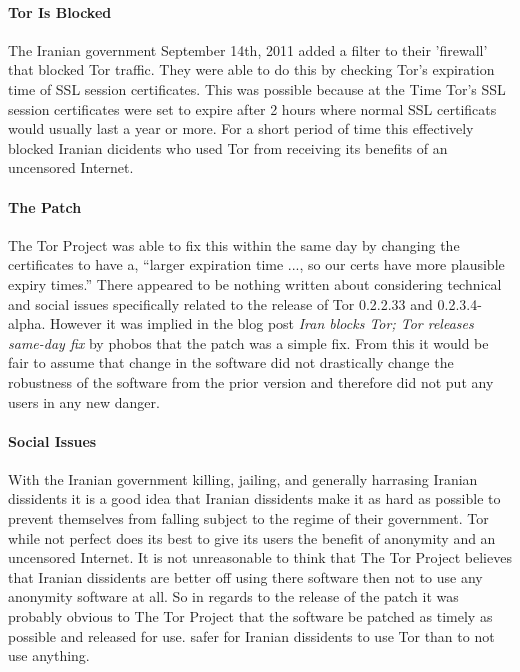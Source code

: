 \documentclass[11pt]{article}
\begin{document}
\begin{multicols}{2}
\paragraph{Tor Is Blocked}

The Iranian government September 14th, 2011 added a filter to their 'firewall'
that blocked Tor traffic. They were able to do this by checking Tor's expiration
time of SSL session certificates. This was possible because at the Time Tor's
SSL session certificates were set to expire after 2 hours where normal SSL
certificats would usually last a year or more. For a short period of time this
effectively blocked Iranian dicidents who used Tor from receiving its benefits
of an uncensored Internet. \cite{IranBlocksTorSameDayFix}

\paragraph{The Patch} 

The Tor Project was able to fix this within the same day by changing the
certificates to have a, ``larger expiration time ..., so our certs have more
plausible expiry times.'' \cite{IranBlocksTorSameDayFix} There appeared to be
nothing written about considering technical and social issues specifically
related to the release of Tor 0.2.2.33 and 0.2.3.4-alpha.  However it was
implied in the blog post \textit{Iran blocks Tor; Tor releases same-day fix} by
phobos that the patch was a simple fix. \cite{IranBlocksTorSameDayFix} From this
it would be fair to assume that change in the software did not drastically
change the robustness of the software from the prior version and therefore did
not put any users in any new danger.

\paragraph{Social Issues}

With the Iranian government killing, jailing, and generally harrasing Iranian
dissidents it is a good idea that Iranian dissidents make it as hard as possible
to prevent themselves from falling subject to the regime of their government.
Tor while not perfect does its best to give its users the benefit of anonymity
and an uncensored Internet. It is not unreasonable to think that The Tor Project
believes that Iranian dissidents are better off using there software then not to
use any anonymity software at all. So in regards to the release of the patch it
was probably obvious to The Tor Project that the software be patched as timely
as possible and released for use. safer for Iranian dissidents to use Tor than
to not use anything.


\end{multicols}
\end{document}
